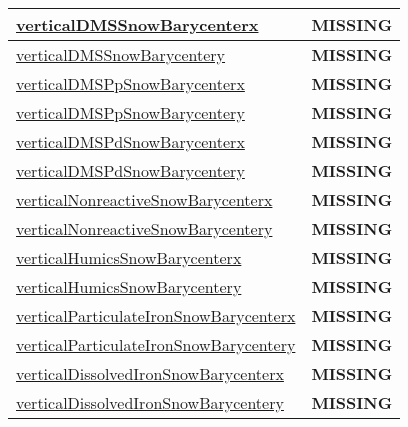 {\begin{center}
\begin{longtable}{| p{2.0in} | p{4.0in} |}
    \hline
    \hyperref[subsec:var_sec_tracer_barycenter_verticalDMSSnowBarycenterx]{verticalDMSSnowBarycenterx} & {\bf \color{red} MISSING} \\
    \hline
    \hyperref[subsec:var_sec_tracer_barycenter_verticalDMSSnowBarycentery]{verticalDMSSnowBarycentery} & {\bf \color{red} MISSING} \\
    \hline
    \hyperref[subsec:var_sec_tracer_barycenter_verticalDMSPpSnowBarycenterx]{verticalDMSPpSnowBarycenterx} & {\bf \color{red} MISSING} \\
    \hline
    \hyperref[subsec:var_sec_tracer_barycenter_verticalDMSPpSnowBarycentery]{verticalDMSPpSnowBarycentery} & {\bf \color{red} MISSING} \\
    \hline
    \hyperref[subsec:var_sec_tracer_barycenter_verticalDMSPdSnowBarycenterx]{verticalDMSPdSnowBarycenterx} & {\bf \color{red} MISSING} \\
    \hline
    \hyperref[subsec:var_sec_tracer_barycenter_verticalDMSPdSnowBarycentery]{verticalDMSPdSnowBarycentery} & {\bf \color{red} MISSING} \\
    \hline
    \hyperref[subsec:var_sec_tracer_barycenter_verticalNonreactiveSnowBarycenterx]{verticalNonreactiveSnow\-Barycenterx} & {\bf \color{red} MISSING} \\
    \hline
    \hyperref[subsec:var_sec_tracer_barycenter_verticalNonreactiveSnowBarycentery]{verticalNonreactiveSnow\-Barycentery} & {\bf \color{red} MISSING} \\
    \hline
    \hyperref[subsec:var_sec_tracer_barycenter_verticalHumicsSnowBarycenterx]{verticalHumicsSnowBarycenterx} & {\bf \color{red} MISSING} \\
    \hline
    \hyperref[subsec:var_sec_tracer_barycenter_verticalHumicsSnowBarycentery]{verticalHumicsSnowBarycentery} & {\bf \color{red} MISSING} \\
    \hline
    \hyperref[subsec:var_sec_tracer_barycenter_verticalParticulateIronSnowBarycenterx]{verticalParticulateIronSnow\-Barycenterx} & {\bf \color{red} MISSING} \\
    \hline
    \hyperref[subsec:var_sec_tracer_barycenter_verticalParticulateIronSnowBarycentery]{verticalParticulateIronSnow\-Barycentery} & {\bf \color{red} MISSING} \\
    \hline
    \hyperref[subsec:var_sec_tracer_barycenter_verticalDissolvedIronSnowBarycenterx]{verticalDissolvedIronSnow\-Barycenterx} & {\bf \color{red} MISSING} \\
    \hline
    \hyperref[subsec:var_sec_tracer_barycenter_verticalDissolvedIronSnowBarycentery]{verticalDissolvedIronSnow\-Barycentery} & {\bf \color{red} MISSING} \\

\end{longtable}
\end{center}}
